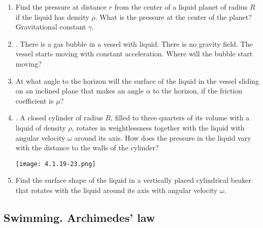 \documentclass{article}
\begin{document}
\begin{enumerate}[label=4.1.\arabic*]
\item Find the pressure at distance $r$ from the center of a liquid planet of radius $R$ if the liquid has density $\rho$. What is the pressure at the center of the planet? Gravitational constant $\gamma$.  

\item. There is a gas bubble in a vessel with liquid. There is no gravity field. The vessel starts moving with constant acceleration. Where will the bubble start moving? 

\item At what angle to the horizon will the surface of the liquid in the vessel sliding on an inclined plane that makes an angle $\alpha$ to the horizon, if the friction coefficient is $\mu$? 

\item . A closed cylinder of radius $R$, filled to three quarters of its volume with a liquid of density $\rho$, rotates in weightlessness together with the liquid with angular velocity $\omega$ around its axis. How does the pressure in the liquid vary with the distance to the walls of the cylinder? 

\begin{center}
    \texttt{[image: 4.1.19-23.png]}
\end{center}


\item Find the surface shape of the liquid in a vertically placed cylindrical beaker that rotates with the liquid around its axis with angular velocity $\omega$.




\end{enumerate}



\subsection{Swimming. Archimedes' law}
\end{document}
